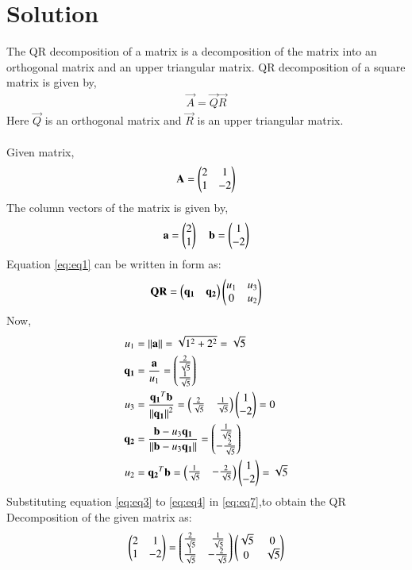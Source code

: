 \documentclass[journal,12pt,twocolumn]{IEEEtran}
\begin{document}
\section{Solution}
The QR decomposition  of a matrix is a decomposition of the matrix into an orthogonal matrix and an upper triangular matrix.
QR decomposition of a square matrix is given by,
\begin{align}
    \vec{A} = \vec{Q}\vec{R}
\end{align}
Here  $\vec{Q}$ is an orthogonal matrix and $\vec{R}$ is an upper triangular matrix.\\
\\
Given matrix,
\begin{align}
    \mathbf{A} = 
    \begin{pmatrix}2&1\\
    1&-2\end{pmatrix} \label{eq:eq1}
\end{align}
The column vectors of the matrix is given by,
\begin{align}
    \mathbf{a}=\begin{pmatrix}2\\1\end{pmatrix} \quad \mathbf{b}=\begin{pmatrix}1\\-2\end{pmatrix} \label{eq:eq2}
\end{align}
Equation \eqref{eq:eq1} can be written in  form as:
\begin{align}
    \mathbf{Q}\mathbf{R} = \begin{pmatrix}\mathbf{q_1}&\mathbf{q_2}\end{pmatrix} \begin{pmatrix}u_1&u_3\\0&u_2\end{pmatrix}  \label{eq:eq7}
\end{align}
Now, 
\begin{align}
u_1 &= \left\lVert\mathbf{a}\right\rVert = \sqrt{1^2+2^2} = \sqrt{5}\label{eq:eq3}\\
\mathbf{q_1} &= \frac{\mathbf{a}}{u_1} = \begin{pmatrix}\frac{2}{\sqrt{5}}\\ \frac{1}{\sqrt{5}}\end{pmatrix}\\
u_3 &= \frac{\mathbf{q_1}^T\mathbf{b}}{\left\lVert\mathbf{q_1}\right\rVert^2} = \begin{pmatrix}\frac{2}{\sqrt{5}}& \frac{1}{\sqrt{5}}\end{pmatrix}\begin{pmatrix}1\\-2\end{pmatrix} = 0\\
\mathbf{q_2} &= \frac{\mathbf{b} - u_3 \mathbf{q_1}}{\left\lVert\mathbf{b} - u_3 \mathbf{q_1}\right\rVert} = \begin{pmatrix}\frac{1}{\sqrt{5}}\\ -\frac{2}{\sqrt{5}}\end{pmatrix}\\
u_2 &= {\mathbf{q_2}^T\mathbf{b}} = \begin{pmatrix}\frac{1}{\sqrt{5}}&-\frac{2}{\sqrt{5}}\end{pmatrix}\begin{pmatrix}1\\-2\end{pmatrix}=\sqrt{5}\label{eq:eq4}
\end{align}
Substituting equation \eqref{eq:eq3} to \eqref{eq:eq4} in \eqref{eq:eq7},to obtain
the QR Decomposition of the given matrix as:
\begin{align}\label{eqort}
    \begin{pmatrix}2&1\\1&-2\end{pmatrix} = \begin{pmatrix}\frac{2}{\sqrt{5}}&\frac{1}{\sqrt{5}}\\\frac{1}{\sqrt{5}}&-\frac{2}{\sqrt{5}}\end{pmatrix}\begin{pmatrix}\sqrt{5}&0\\0&{\sqrt{5}}\end{pmatrix}
\end{align}
\end{document}
